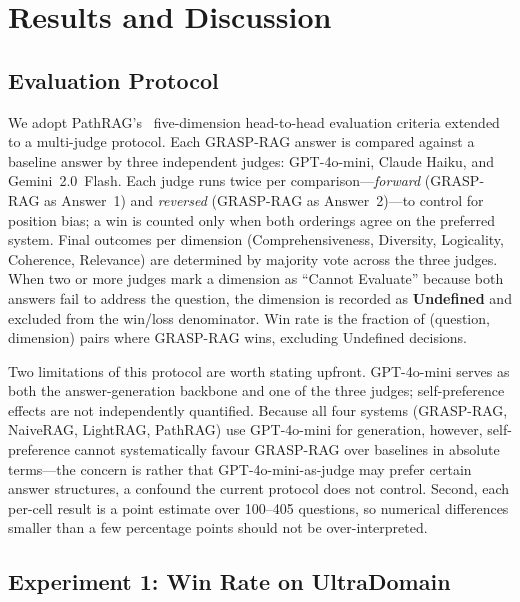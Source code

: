 \section{Results and Discussion}
\label{sec:results}

\subsection{Evaluation Protocol}
\label{sec:eval}

We adopt PathRAG's~\cite{chen2025pathrag} five-dimension head-to-head
evaluation criteria extended to a multi-judge protocol.
Each GRASP-RAG answer is compared against a baseline answer by three
independent judges: GPT-4o-mini, Claude Haiku, and Gemini~2.0~Flash.
Each judge runs twice per comparison---\emph{forward} (GRASP-RAG as Answer~1)
and \emph{reversed} (GRASP-RAG as Answer~2)---to control for position bias;
a win is counted only when both orderings agree on the preferred system.
Final outcomes per dimension (Comprehensiveness, Diversity, Logicality,
Coherence, Relevance) are determined by majority vote across the three judges.
When two or more judges mark a dimension as ``Cannot Evaluate'' because both
answers fail to address the question, the dimension is recorded as
\textbf{Undefined} and excluded from the win/loss denominator.
Win rate is the fraction of (question, dimension) pairs where GRASP-RAG wins,
excluding Undefined decisions.

Two limitations of this protocol are worth stating upfront.
GPT-4o-mini serves as both the answer-generation backbone and one of the three
judges; self-preference effects are not independently quantified.
Because all four systems (GRASP-RAG, NaiveRAG, LightRAG, PathRAG) use
GPT-4o-mini for generation, however, self-preference cannot systematically
favour GRASP-RAG over baselines in absolute terms---the concern is rather
that GPT-4o-mini-as-judge may prefer certain answer structures, a confound
the current protocol does not control.
Second, each per-cell result is a point estimate over 100--405 questions, so
numerical differences smaller than a few percentage points should not be
over-interpreted.

\subsection{Experiment 1: Win Rate on UltraDomain}
\label{sec:exp1}

